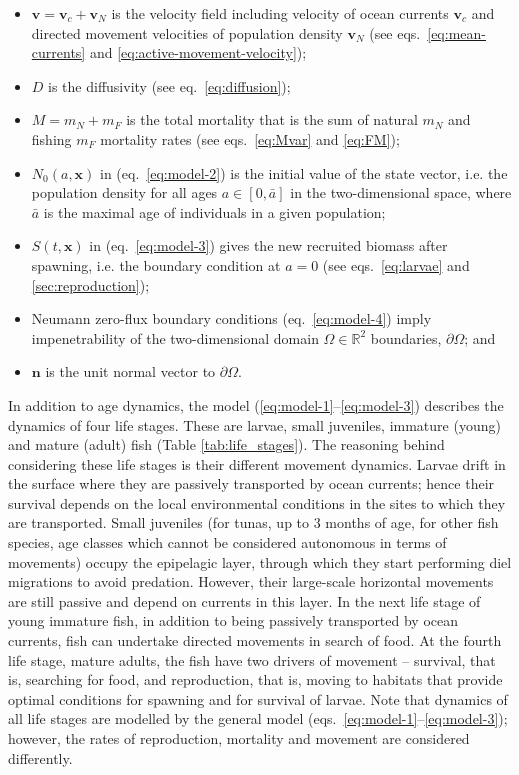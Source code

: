 \begin{itemize}

\item[] $\mathbf{v}={\mathbf{v}}_c+{\mathbf{v}}_N$ is the velocity field including velocity of ocean currents ${\mathbf{v}}_c$ and directed movement velocities of population density ${\mathbf{v}}_N$ (see eqs.~\ref{eq:mean-currents} and \ref{eq:active-movement-velocity});
\item[] $D$ is the diffusivity (see eq.~\ref{eq:diffusion}); 
\item[] $M = m_N + m_F$ is the total mortality that is the sum of natural $m_N$ and fishing $m_F$ mortality rates (see eqs.~\ref{eq:Mvar} and \ref{eq:FM}); 
\item[] $N_0(a,\mathbf{x})$ in (eq.~\ref{eq:model-2}) is the initial value of the state vector, i.e. the population density for all ages $a \in \left[0,\bar{a}\right]$ in the two-dimensional space, where $\bar{a}$ is the maximal age of individuals in a given population; 
\item[] $S(t,\mathbf{x})$ in (eq.~\ref{eq:model-3}) gives the new recruited biomass after spawning, i.e. the boundary condition at $a=0$ (see eqs.~\ref{eq:larvae} and \hyperref[sec:reproduction]{\ref*{sec:reproduction}}); 
\item[] Neumann zero-flux boundary conditions (eq.~\ref{eq:model-4}) imply impenetrability of the two-dimensional domain $\Omega\in\mathbb{R}^2$ boundaries, $\partial \Omega$; 
and
\item[] $\mathbf{n}$ is the unit normal vector to $\partial\Omega$.
\end{itemize}


In addition to age dynamics, the model (\ref{eq:model-1}--\ref{eq:model-3}) describes the dynamics of four life stages. These are larvae, small juveniles, immature (young) and mature (adult) fish (Table \ref{tab:life_stages}). The reasoning behind considering these life stages is their different movement dynamics. Larvae drift in the surface where they are passively transported by ocean currents; hence their survival depends on the local environmental conditions in the sites to which they are transported. Small juveniles (for tunas, up to 3 months of age, for other fish species, age classes which cannot be considered autonomous in terms of movements) occupy the epipelagic layer, through which they start performing diel migrations to avoid predation. However, their large-scale horizontal movements are still passive and depend on currents in this layer. In the next life stage of young immature fish, in addition to being passively transported by ocean currents, fish can undertake directed movements in search of food. At the fourth life stage, mature adults, the fish have two drivers of movement -- survival, that is, searching for food, and reproduction, that is, moving to habitats that provide optimal conditions for spawning and for survival of larvae. Note that dynamics of all life stages are modelled by the general model (eqs.~\ref{eq:model-1}--\ref{eq:model-3}); however, the rates of reproduction, mortality and movement are considered differently. 



